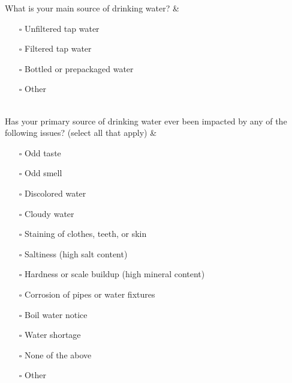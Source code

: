 \documentclass[
]{article}
\begin{document}
\begin{longtblr}[         %
caption={},
entry=none,label=none,
note{1}={Matrix style question.},
label=tblr:quest,
caption={Survey questions.},
]
What is your main source of drinking water?                                                                                                                                                                                                                                                                                                                                                                                                                                  & \begin{itemize}[nosep]    \item[$\square$] Unfiltered tap water    \item[$\square$] Filtered tap water    \item[$\square$] Bottled or prepackaged water    \item[$\square$] Other    \end{itemize}                                                                                                                                                                                                                                                                                                                                                                                                                               \\
Has your primary source of drinking water ever been impacted by any of the following issues? (select all that apply)                                                                                                                                                                                                                                                                                                                                                         & \begin{itemize}[nosep]    \item[$\square$] Odd taste    \item[$\square$] Odd smell    \item[$\square$] Discolored water    \item[$\square$] Cloudy water    \item[$\square$] Staining of clothes, teeth, or skin    \item[$\square$] Saltiness (high salt content)    \item[$\square$] Hardness or scale buildup (high mineral content)    \item[$\square$] Corrosion of pipes or water fixtures    \item[$\square$] Boil water notice    \item[$\square$] Water shortage    \item[$\square$] None of the above    \item[$\square$] Other    \end{itemize}                                       \\

\end{longtblr}
\end{document}

